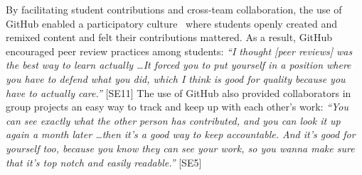By facilitating student contributions and cross-team collaboration, the use of GitHub enabled a participatory culture~\cite{jenkins2009confronting} where students openly created and remixed content and felt their contributions mattered. As a result, GitHub encouraged peer review practices among students: \textit{``I thought [peer reviews] was the best way to learn actually \ldots It forced you to put yourself in a position where you have to defend what you did, which I think is good for quality because you have to actually care.''} [SE11] The use of GitHub also provided collaborators in group projects an easy way to track and keep up with each other's work: \textit{``You can see exactly what the other person has contributed, and you can look it up again a month later \ldots then it's a good way to keep accountable. And it's good for yourself too, because you know they can see your work, so you wanna make sure that it's top notch and easily readable.''} [SE5]




